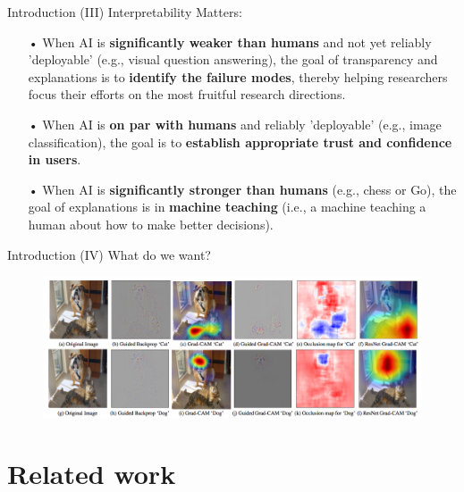 \documentclass[11pt]{beamer}
\begin{document}
\begin{frame}{Introduction (III)}
Interpretability Matters:

\begin{itemize}
\item[•] When AI is \textbf{significantly weaker than humans} and not yet reliably 'deployable' (e.g., visual question answering), the goal of transparency and explanations is to\textbf{ identify the failure modes}, thereby helping researchers focus their efforts on the most fruitful research directions.
\item[•] When AI is \textbf{on par with humans} and reliably 'deployable' (e.g., image classification), the goal is to \textbf{establish appropriate trust and confidence in users}.
\item[•] When AI is \textbf{significantly stronger than humans} (e.g., chess or Go), the goal of explanations is in \textbf{machine teaching} (i.e., a machine teaching a human about how to make better decisions).
\end{itemize}
\end{frame}

\begin{frame}{Introduction (IV)}
What do we want?
\begin{figure}
    \includegraphics[width=1.05\textwidth]{first.png}
\end{figure}
\end{frame}

\section{Related work}


\frame{\tableofcontents[currentsection]}

\end{document}
